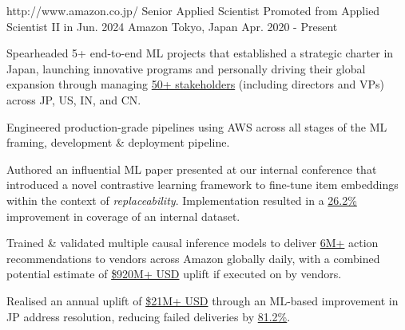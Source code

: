 

\begin{cventries}

  \cventry
    {http://www.amazon.co.jp/}
    {Senior Applied Scientist} %
    {Promoted from Applied Scientist II in Jun. 2024}
    {Amazon} %
    {Tokyo, Japan} %
    {Apr. 2020 - Present} %
    {
      \begin{cvitems} %
        \item {Spearheaded 5+ end-to-end ML projects that established a strategic charter in Japan, launching innovative programs and personally driving their global expansion through managing \underline{50+ stakeholders} (including directors and VPs) across JP, US, IN, and CN.}
        \item {Engineered production-grade pipelines using AWS across all stages of the ML framing, development \& deployment pipeline.}
        \item {Authored an influential ML paper presented at our internal conference that introduced a novel contrastive learning framework to fine-tune item embeddings within the context of \textit{replaceability}. Implementation resulted in a \underline{26.2\%} improvement in coverage of an internal dataset.}
        \item {Trained \& validated multiple causal inference models to deliver \underline{6M+} action recommendations to vendors across Amazon globally daily, with a combined potential estimate of \underline{\$920M+ USD} uplift if executed on by vendors.}
        \item {Realised an annual uplift of \underline{\$21M+ USD} through an ML-based improvement in JP address resolution, reducing failed deliveries by \underline{81.2\%}.}
      \end{cvitems}
    }



\end{cventries}
